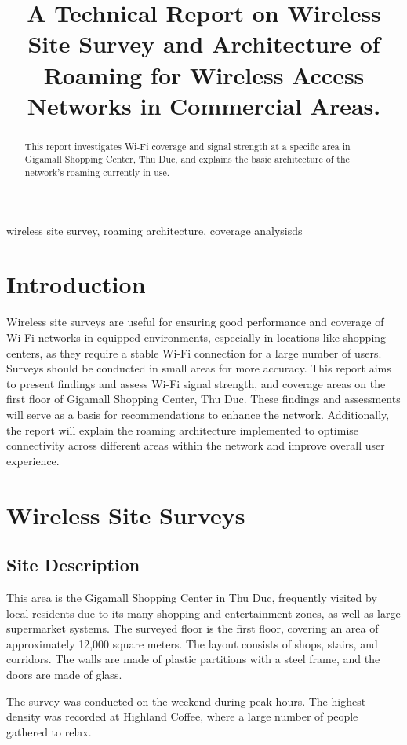 \documentclass[conference]{IEEEtran}
\title{A Technical Report on Wireless Site Survey and Architecture of Roaming for Wireless Access Networks in Commercial Areas.}
\author{
    \IEEEauthorblockN{Nguyen Duc Chi Dat}
    \IEEEauthorblockA{
        \textit{Faculty of Information Security,} \\
        \textit{University of Information Technology}\\ 
        Ho Chi Minh City, Viet Nam \\
        datndc.19@grad.uit.edu.vn
    }
}
\begin{document}
\maketitle

\begin{abstract}
This report investigates Wi-Fi coverage and signal strength at a specific area in Gigamall Shopping Center, Thu Duc, and explains the basic architecture of the network's roaming currently in use.
\end{abstract}

\begin{IEEEkeywords}
wireless site survey, roaming architecture, coverage analysisds
\end{IEEEkeywords}

\section{Introduction}
Wireless site surveys are useful for ensuring good performance and coverage of Wi-Fi networks in equipped environments, especially in locations like shopping centers, as they require a stable Wi-Fi connection for a large number of users. Surveys should be conducted in small areas for more accuracy. This report aims to present findings and assess Wi-Fi signal strength, and coverage areas on the first floor of Gigamall Shopping Center, Thu Duc. These findings and assessments will serve as a basis for recommendations to enhance the network. Additionally, the report will explain the roaming architecture implemented to optimise connectivity across different areas within the network and improve overall user experience.
\section{Wireless Site Surveys}

\subsection{Site Description}
This area is the Gigamall Shopping Center in Thu Duc, frequently visited by local residents due to its many shopping and entertainment zones, as well as large supermarket systems. The surveyed floor is the first floor, covering an area of approximately 12,000 square meters. The layout consists of shops, stairs, and corridors. The walls are made of plastic partitions with a steel frame, and the doors are made of glass.

The survey was conducted on the weekend during peak hours. The highest density was recorded at Highland Coffee, where a large number of people gathered to relax.
\end{document}
